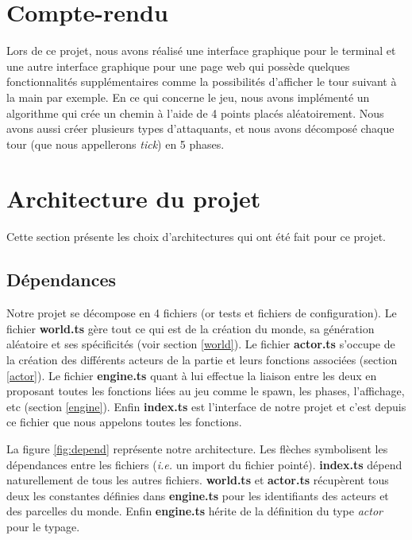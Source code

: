 \documentclass{article}
\begin{document}
\vspace{2cm}
\section{Compte-rendu}
Lors de ce projet, nous avons réalisé une interface graphique pour le terminal et une autre interface graphique pour une page web qui possède quelques fonctionnalités supplémentaires comme la possibilités d'afficher le tour suivant à la main par exemple. En ce qui concerne le jeu, nous avons implémenté un algorithme qui crée un chemin à l'aide de 4 points placés aléatoirement. Nous avons aussi créer plusieurs types d'attaquants, et nous avons décomposé chaque tour (que nous appellerons \textit{tick}) en 5 phases. 

\newpage
\section{Architecture du projet}
Cette section présente les choix d'architectures qui ont été fait pour ce projet.

\subsection{Dépendances}
Notre projet se décompose en 4 fichiers (or tests et fichiers de configuration). Le fichier \textbf{world.ts} gère tout ce qui est de la création du monde, sa génération aléatoire et ses spécificités (voir section \ref{world}). Le fichier \textbf{actor.ts} s'occupe de la création des différents acteurs de la partie et leurs fonctions associées (section \ref{actor}). Le fichier \textbf{engine.ts} quant à lui effectue la liaison entre les deux en proposant toutes les fonctions liées au jeu comme le spawn, les phases, l'affichage, etc (section \ref{engine}). Enfin \textbf{index.ts} est l'interface de notre projet et c'est depuis ce fichier que nous appelons toutes les fonctions.
\vspace{1cm}

La figure \ref{fig:depend} représente notre architecture. Les flèches symbolisent les dépendances entre les fichiers (\textit{i.e.} un import du fichier pointé). \textbf{index.ts} dépend naturellement de tous les autres fichiers. \textbf{world.ts} et \textbf{actor.ts} récupèrent tous deux les constantes définies dans \textbf{engine.ts} pour les identifiants des acteurs et des parcelles du monde. Enfin \textbf{engine.ts} hérite de la définition du type \textit{actor} pour le typage.
\vspace{1cm}
\end{document}
